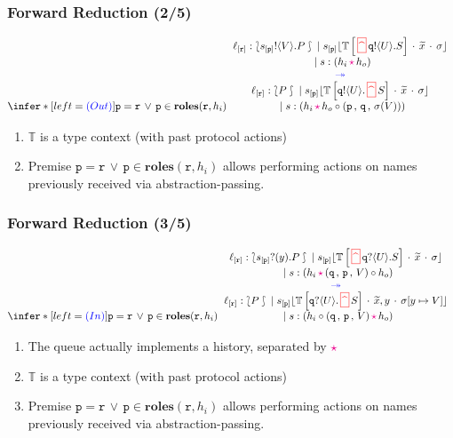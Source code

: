 \documentclass[12pt]{beamer}
\newcommand{\myctxr}[2]{{#1\left[\textcolor{black}{#2}\right]}}
\newcommand{\fwcolor}[1]{\textcolor{blue}{#1}}
\newcommand{\sepcolor}[1]{\textcolor{magenta}{#1}}
\newcommand{\upd}[2]{[#1\mapsto #2]}
\newcommand{\sred}[1]{\textcolor{myred}{#1}}
\newcommand{\bi}{\begin{enumerate}[$\bullet$]}
\newcommand{\ei}{\end{enumerate}}
\newcommand{\queue}[1]{\lfloor #1 \rfloor}
\newcommand{\store}{\sigma}
\newcommand{\ctx}[1]{\mathbb{#1}}
\newcommand{\mysepp}{\,\cdot\,}
\newcommand{\myeval}[2]{#2(#1)}
\newcommand{\mytilde}[1]{\widetilde{#1}}
\newcommand{\codah}[4]{\coda{#1}{(#2\,\history\,#3)\!#4}}
\newcommand{\history}{\sepcolor{\mathbf{\star}}}
\newcommand{\coda}[2]{#1:#2}
\newcommand{\gpart}[1]{\mathtt{#1}}
\newcommand{\moni}[4]{\ensuremath{{#1\queue{\textcolor{black}{#2}\mysepp #3\mysepp #4}}}}
\newcommand{\past}{\,\text{\textcolor{red}{\textbf{\textasciicircum}}}\,}
\newcommand{\mypast}{\,\sred{\framebox[3mm]{\past}\,}}
\newcommand{\names}[1]{\mathtt{\mathbf{roles}}(#1)}
\newcommand{\conf}[2]{\lbag #2 \rbag} %
\newcommand{\stack}[1]{\mathtt{#1}}
\newcommand{\ltout}[3]{\gpart{#1}!\langle#2\rangle.#3}
\newcommand{\ltinp}[3]{\gpart{#1}?\langle#2\rangle.#3}
\newcommand{\outses}{!}
\newcommand{\inpses}{?}
\newcommand{\Par}{\;|\;}
\newcommand{\valueq}[3]{(#1 \,,\, #2 \,,\,#3)}
\newcommand{\freev}[1]{\langle #1\rangle}
\newcommand{\boundv}[1]{(#1)}
\newcommand{\shsep}{.}
\newcommand{\cons}{\circ}
\newcommand{\bout}[2]{#1 \outses \freev{#2} \shsep}
\newcommand{\binp}[2]{#1 \inpses \boundv{#2} \shsep}
\newcommand{\fw}{\ensuremath{\fwcolor{\,\twoheadrightarrow\,}}}
\newcommand{\p}{\ensuremath{\mathtt{p}}\xspace}
\newcommand{\q}{\ensuremath{\mathtt{q}}\xspace}
\newcommand{\er}{\ensuremath{\mathtt{r}}}
\newcommand{\ltinpp}[3]{\gpart{#1}?\langle#2\rangle.\mypast #3}
\newcommand{\key}[2]{#1_{[#2]}}
\newcommand{\np}[2]{#1:#2}
\newcommand{\ep}[2]{#1_{[#2]}}
\newcommand{\loc}{\ell}
\newcommand{\ltoutp}[3]{\gpart{#1}!\langle#2\rangle.\mypast #3}
\begin{document}
\begin{frame}
	\frametitle{Forward Reduction  (2/5)}
$$
\infer*[left=\fwcolor{(Out)}]{
\p = \er \,\vee\, \p \in \names{\er, h_i}
}
{
{\begin{tabular}[b]{c}
$\np{\key{\loc}{\er}}{ \conf{\stack{C}}{\bout{\ep{s}{\p}}{V}{P}}} \Par \moni{\ep{s}{\p}}{\myctxr{\ctx{T}}{\mypast  \ltout{\q}{U}{S}}}{\mytilde x}{\store} 
$
 \\ 
 $\Par \codah{s}{h_i}{h_o}{} $
\\
\fw 
\\
$\np{\key{\loc}{\er}}{\conf{\stack{C}}{P}} \Par \moni{\ep{s}{\p}}{\myctxr{\ctx{T}}{ \ltoutp{\q}{U}{S}}}{\mytilde x}{\store}$ 
\\[1mm]
$\Par 
\codah{s}{h_i}{h_o\cons \valueq{\p}{\q}{\myeval{V}{\sigma}}}{}$
\end{tabular} 
}
}
$$
\vspace{-3mm}
\bi
\item $\ctx{T}$ is a type context (with past protocol actions)
\item Premise $\p = \er \,\vee\, \p \in \names{\er, h_i}$ allows performing actions on names previously received via abstraction-passing.
\ei
\end{frame}

\begin{frame}
	\frametitle{Forward Reduction  (3/5)}
$$
\infer*[left=\fwcolor{(In)}]{
\p = \er \,\vee\, \p \in \names{\er, h_i}
}
{
{\begin{tabular}[b]{c}
$\np{\key{\loc}{\er}}{\conf{\stack{C}}{\binp{\ep{s}{\p}}{y}{P}}} \Par \moni{\ep{s}{\p}}{\myctxr{\ctx{T}}{\mypast  \ltinp{\q}{U}{S}}}{\mytilde x}{\store}
$
 \\ 
 $\Par \codah{s}{h_i}{\valueq{\q}{\p}{V}\cons h_o }{}$
\\
\fw 
\\
$\np{\key{\loc}{\er}}{\conf{\stack{C}}{P}} \Par \moni{\ep{s}{\p}}{ \myctxr{\ctx{T}}{\ltinpp{\q}{U}{S}}}{\mytilde x, y}{\store\upd{y}{V}}$ 
\\[1mm]
$\Par \codah{s}{h_i\cons  \valueq{\q}{\p}{V}}{h_o }{} $
\end{tabular} 
}
}
$$
\vspace{-3mm}
\bi
\item The queue actually implements a history, separated by $\history$
\item $\ctx{T}$ is a type context (with past protocol actions)
\item Premise $\p = \er \,\vee\, \p \in \names{\er, h_i}$ allows performing actions on names previously received via abstraction-passing.
\ei
\end{frame}
\end{document}
